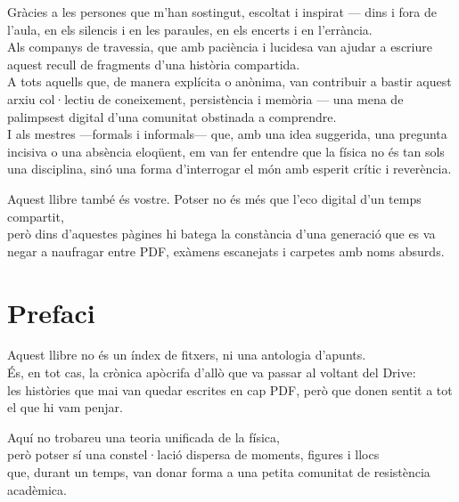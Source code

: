 \documentclass[12pt, a5paper, twoside]{book}
\let\cleardoublepage\clearpage %
\begin{document}
\noindent
Gràcies a les persones que m’han sostingut, escoltat i inspirat — dins i fora de l’aula, en els silencis i en les paraules, en els encerts i en l’errància.\\
Als companys de travessia, que amb paciència i lucidesa van ajudar a escriure aquest recull de fragments d’una història compartida.\\
A tots aquells que, de manera explícita o anònima, van contribuir a bastir aquest arxiu col·lectiu de coneixement, persistència i memòria — una mena de palimpsest digital d’una comunitat obstinada a comprendre.\\
I als mestres —formals i informals— que, amb una idea suggerida, una pregunta incisiva o una absència eloqüent, em van fer entendre que la física no és tan sols una disciplina, sinó una forma d’interrogar el món amb esperit crític i reverència.

\medskip

\noindent
Aquest llibre també és vostre. Potser no és més que l’eco digital d’un temps compartit,\\
però dins d’aquestes pàgines hi batega la constància d’una generació que es va negar a naufragar entre PDF, exàmens escanejats i carpetes amb noms absurds.

\cleardoublepage

\chapter*{Prefaci}
\vspace{0.5cm}

\noindent
Aquest llibre no és un índex de fitxers, ni una antologia d’apunts.\\
És, en tot cas, la crònica apòcrifa d’allò que va passar al voltant del Drive:\\
les històries que mai van quedar escrites en cap PDF, però que donen sentit a tot el que hi vam penjar.\\

\medskip

\noindent
Aquí no trobareu una teoria unificada de la física,\\
però potser sí una constel·lació dispersa de moments, figures i llocs\\
que, durant un temps, van donar forma a una petita comunitat de resistència acadèmica.\\
\end{document}
